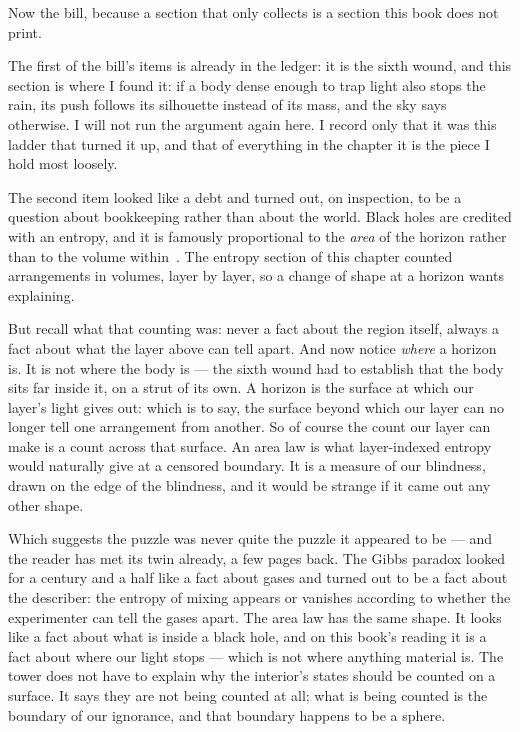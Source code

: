\documentclass[fontsize=11pt,paper=a4,pagesize=auto,parskip=half-]{scrbook}
\begin{document}
Now the bill, because a section that only collects is a section this book does not print.

The first of the bill's items is already in the ledger: it is the sixth wound, and this section is where I found it: if a body dense enough to trap light also stops the rain, its push follows its silhouette instead of its mass, and the sky says otherwise. I will not run the argument again here. I record only that it was this ladder that turned it up, and that of everything in the chapter it is the piece I hold most loosely.

The second item looked like a debt and turned out, on inspection, to be a question about bookkeeping rather than about the world. Black holes are credited with an entropy, and it is famously proportional to the \emph{area} of the horizon rather than to the volume within~\cite{bekenstein1973}. The entropy section of this chapter counted arrangements in volumes, layer by layer, so a change of shape at a horizon wants explaining.

But recall what that counting was: never a fact about the region itself, always a fact about what the layer above can tell apart. And now notice \emph{where} a horizon is. It is not where the body is --- the sixth wound had to establish that the body sits far inside it, on a strut of its own. A horizon is the surface at which our layer's light gives out: which is to say, the surface beyond which our layer can no longer tell one arrangement from another. So of course the count our layer can make is a count across that surface. An area law is what layer-indexed entropy would naturally give at a censored boundary. It is a measure of our blindness, drawn on the edge of the blindness, and it would be strange if it came out any other shape.

Which suggests the puzzle was never quite the puzzle it appeared to be --- and the reader has met its twin already, a few pages back. The Gibbs paradox looked for a century and a half like a fact about gases and turned out to be a fact about the describer: the entropy of mixing appears or vanishes according to whether the experimenter can tell the gases apart. The area law has the same shape. It looks like a fact about what is inside a black hole, and on this book's reading it is a fact about where our light stops --- which is not where anything material is. The tower does not have to explain why the interior's states should be counted on a surface. It says they are not being counted at all; what is being counted is the boundary of our ignorance, and that boundary happens to be a sphere.
\end{document}
